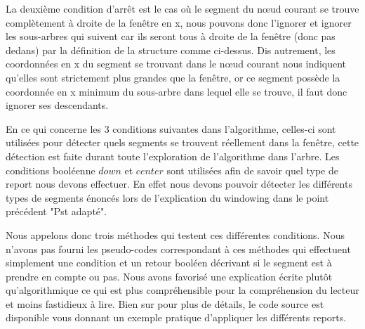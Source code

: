 \documentclass[10pt,a4paper]{article}
\begin{document}
La deuxième condition d'arrêt est le cas où le segment du nœud courant se trouve complètement à droite de la fenêtre en x, nous pouvons donc l'ignorer et ignorer les sous-arbres qui suivent car ils seront tous à droite de la fenêtre (donc pas dedans) par la définition de la structure comme ci-dessus. Dis autrement, les coordonnées en x du segment se trouvant dans le nœud courant nous indiquent qu'elles sont strictement plus grandes que la fenêtre, or ce segment possède la coordonnée en x minimum du sous-arbre dans lequel elle se trouve, il faut donc ignorer ses descendants.

En ce qui concerne les 3 conditions suivantes dans l'algorithme, celles-ci sont utilisées pour détecter quels segments se trouvent réellement dans la fenêtre, cette détection est faite durant toute l'exploration de l'algorithme dans l'arbre. Les conditions booléenne $down$ et $center$ sont utilisées afin de savoir quel type de report nous devons effectuer. En effet nous devons pouvoir détecter les différents types de segments énoncés lors de l'explication du windowing dans le point précédent "Pst adapté".

Nous appelons donc trois méthodes qui testent ces différentes conditions. Nous n'avons pas fourni les pseudo-codes correspondant à ces méthodes qui effectuent simplement une condition et un retour booléen décrivant si le segment est à prendre en compte ou pas. Nous avons favorisé une explication écrite plutôt qu'algorithmique ce qui est plus compréhensible pour la compréhension du lecteur et moins fastidieux à lire. Bien sur pour plus de détails, le code source est disponible vous donnant un exemple pratique d'appliquer les différents reports.
\end{document}
